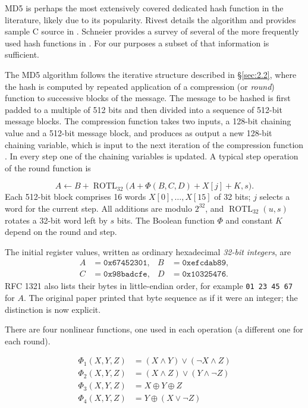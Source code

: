MD5 is perhaps the most extensively covered dedicated hash function in
the literature, likely due to its popularity. Rivest details the
algorithm and provides sample C source in \cite{ref22}.
Schneier provides a survey of several of the more frequently used hash
functions in \cite{ref7}. For our purposes a subset of that
information is sufficient.

The MD5 algorithm follows the iterative structure described in
\S\ref{sec:2.2}, where the hash is computed by repeated
application of a compression (or \emph{round}) function to successive
blocks of the message. The message to be hashed is first padded to a
multiple of 512 bits and then divided into a sequence of 512-bit message
blocks. The compression function takes two inputs, a 128-bit chaining
value and a 512-bit message block, and produces as output a new 128-bit
chaining variable, which is input to the next iteration of the
compression function \cite{ref4}. In every step one of the
chaining variables is updated. A typical step operation of the round
function is

\[
A\leftarrow B+\operatorname{ROTL}_{32}
       \bigl(A+\Phi(B,C,D)+X[j]+K,s\bigr).
\]
Each 512-bit block comprises 16 words $X[0],\ldots,X[15]$ of 32 bits;
$j$ selects a word for the current step. All additions are modulo $2^{32}$,
and $\operatorname{ROTL}_{32}(u,s)$ rotates a 32-bit word left by $s$ bits.
The Boolean function $\Phi$ and constant $K$ depend on the round and step.

The initial register values, written as ordinary hexadecimal \emph{32-bit
integers}, are \cite{ref22}
\begin{equation}\label{eq:3.1}
\begin{aligned}
A&=\mathtt{0x67452301},&B&=\mathtt{0xefcdab89},\\
C&=\mathtt{0x98badcfe},&D&=\mathtt{0x10325476}.
\end{aligned}
\end{equation}
RFC 1321 also lists their bytes in little-endian order, for example
\texttt{01 23 45 67} for $A$. The original paper printed that byte sequence
as if it were an integer; the distinction is now explicit.

There are four nonlinear functions, one used in each operation (a
different one for each round).

\begin{equation}\label{eq:3.2}
\begin{aligned}\Phi_1(X,Y,Z)&=(X\land Y)\lor(\neg X\land Z)\\\Phi_2(X,Y,Z)&=(X\land Z)\lor(Y\land\neg Z)\\\Phi_3(X,Y,Z)&=X\oplus Y\oplus Z\\\Phi_4(X,Y,Z)&=Y\oplus(X\lor\neg Z)\end{aligned}
\end{equation}

